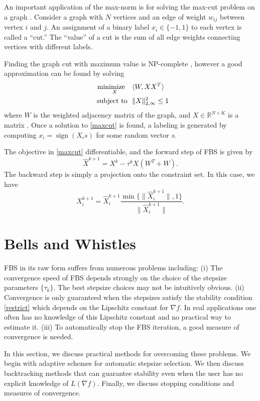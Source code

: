 \documentclass{amsart}
\newcommand{\aln}[1]{\begin{align}#1\end{align}}
\newcommand{\splt}[1]{\begin{split}#1\end{split}}
\newcommand{\ra}{\rangle}
\newcommand{\la}{\langle}
\newcommand{\st}{\hbox{ \,\,subject to\,\, }}
\newcommand{\kp}{^{k+1}}
\newcommand{\reals}{\mathbb{R}}
\DeclareMathOperator*{\minimize}{minimize\quad}
\DeclareMathOperator*{\sign}{sign}
\theoremstyle{definition}
\begin{document}
An important application of the max-norm is for solving the max-cut problem on a graph \cite{LRSST10}. Consider a graph with $N$ vertices and an edge of weight $w_{ij}$ between vertex $i$ and $j.$  An  assignment of a binary label $x_i\in\{-1,1\}$ to each vertex is called a ``cut.''  The ``value'' of a cut is the sum of all edge weights connecting vertices with different labels.

Finding the graph cut with maximum value is NP-complete \cite{GW95}, however a good approximation can be found by solving     
        \aln{ \splt{\minimize_X   &  \la W,XX^T\ra\\  \label{maxcut}
   \st & \|X\|_{2,\infty}^2 \le 1
   }}
where $W$ is the weighted adjacency matrix of the graph, and $X\in \reals^{N\times K}$ is a matrix  \cite{LRSST10}. Once a solution to \eqref{maxcut} is found, a labeling is generated by computing $x_i = \sign(X_is)$ for some random vector $s.$  

The objective in \eqref{maxcut} differentiable, and the forward step of FBS is given by 
$$\widehat X\kp = X^k - \tau^k X(W^T+W).$$ 
The backward step is simply a projection onto the constraint set.  In this case, we have
  $$X\kp_i = \widehat X\kp_i \frac{\min\{\|\widehat X\kp_i\|,1\}}{\|\widehat X\kp_i\|}.$$





\section{Bells and Whistles} \label{sec:baw}
FBS in its raw form suffers from numerous problems including: (i) The convergence speed of FBS depends strongly on the choice of the stepsize parameters $\{\tau_k\}.$ The best stepsize choices may not be intuitively obvious.    (ii)  Convergence is only guaranteed when the stepsizes satisfy the stability condition \eqref{restrict} which depends on the Lipschitz constant for $\nabla f.$  In real applications one often has no knowledge of this Lipschitz constant and no practical way to estimate it.  (iii) To automatically stop the FBS iteration, a good measure of convergence is needed.

  In this section, we discuss practical methods for overcoming these problems.  We begin with adaptive schemes for automatic stepsize selection.  We then discuss backtracking methods that can guarantee stability even when the user has no explicit knowledge of $L(\nabla f).$  Finally, we discuss stopping conditions and measures of convergence.
\end{document}
